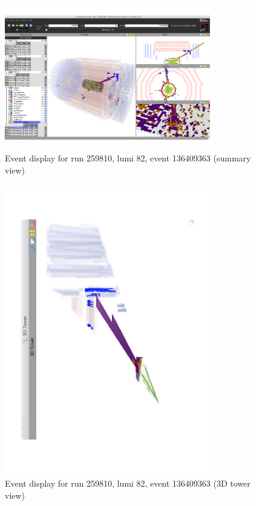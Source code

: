 \begin{figure}[tbhp]
  \caption{Event display for run 259810, lumi 82, event 136409363 (summary view)}
  \label{fig:cmsShow_001}
  \begin{center}    
    \includegraphics[width=0.8\textwidth]{figures/susyResults/cmsShow_001}
  \end{center}
\end{figure}
\begin{figure}[tbhp]
  \caption{Event display for run 259810, lumi 82, event 136409363 (3D tower view)}
  \label{fig:cmsShow_002}
  \begin{center}    
    \includegraphics[width=0.8\textwidth]{figures/susyResults/cmsShow_002}
  \end{center}
\end{figure}
